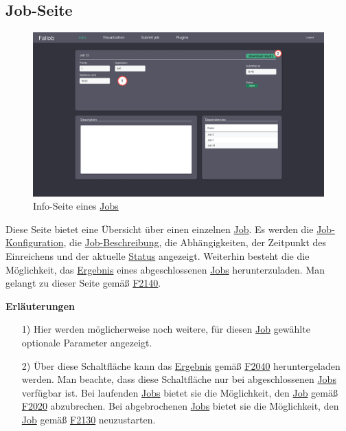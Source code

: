 \subsection{Job-Seite}
\label{pages:job-page}
\begin{figure}[H]
    \centering
    \includegraphics[width=\textwidth]{images-interface/v5_interface/job_info_page_5.pdf}
    \caption{Info-Seite eines \hyperref[B:Jobs]{Jobs}}
    \label{fig:job-page}
\end{figure}
Diese Seite bietet eine Übersicht über einen einzelnen \hyperref[B:Jobs]{Job}. Es werden die \hyperref[B:Job-Konfiguration]{Job-Konfiguration}, die \hyperref[B:Job-Beschreibung]{Job-Beschreibung}, die Abhängigkeiten, der Zeitpunkt des Einreichens und der aktuelle \hyperref[B:Job-Status]{Status} angezeigt. Weiterhin besteht die die Möglichkeit, das \hyperref[B:Job-Ergebnis]{Ergebnis} eines abgeschlossenen \hyperref[B:Jobs]{Jobs} herunterzuladen. Man gelangt zu dieser Seite gemäß \hyperref[FA:Web-Interface:Einsehen von Job-Informationen]{F2140}.

\textbf{Erläuterungen}
\begin{itemize}
    \item[1)] Hier werden möglicherweise noch weitere, für diesen \hyperref[B:Jobs]{Job} gewählte optionale Parameter angezeigt.
    \item[2)] Über diese Schaltfläche kann das \hyperref[B:Job-Ergebnis]{Ergebnis} gemäß \hyperref[FA:Web-Interface:Herunterladen eines einzelnen Ergebnisses]{F2040} heruntergeladen werden. Man beachte, dass diese Schaltfläche nur bei abgeschlossenen \hyperref[B:Jobs]{Jobs} verfügbar ist. Bei laufenden \hyperref[B:Jobs]{Jobs} bietet sie die Möglichkeit, den \hyperref[B:Jobs]{Job} gemäß \hyperref[FA:Web-Interface:Abbruch eines einzelnen Jobs]{F2020} abzubrechen. Bei abgebrochenen \hyperref[B:Jobs]{Jobs} bietet sie die Möglichkeit, den \hyperref[B:Jobs]{Job} gemäß \hyperref[Neustart eines abgebrochenen Jobs]{F2130} neuzustarten.
\end{itemize}

